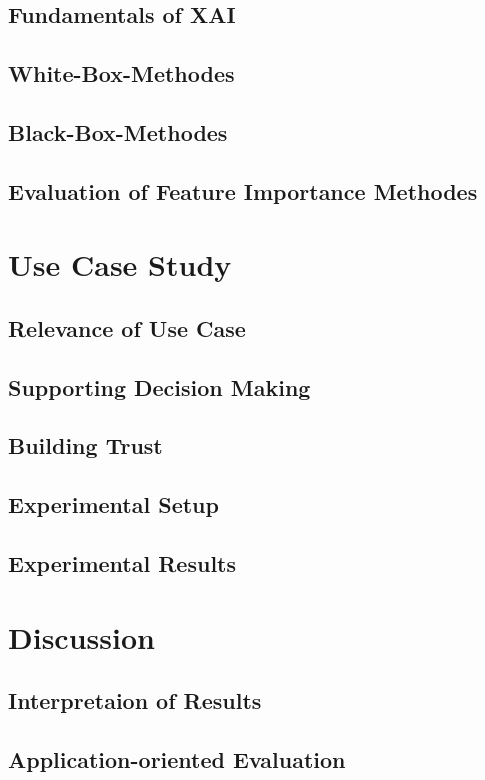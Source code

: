 \documentclass{article}
\begin{document}
\subsection{Fundamentals of XAI}
\subsection{White-Box-Methodes}
\subsection{Black-Box-Methodes}
\subsection{Evaluation of Feature Importance Methodes}

\section{Use Case Study}
\subsection{Relevance of Use Case}
\subsection{Supporting Decision Making}
\subsection{Building Trust}
\subsection{Experimental Setup}
\subsection{Experimental Results}

\section{Discussion}
\subsection{Interpretaion of Results}
\subsection{Application-oriented Evaluation}
\end{document}
